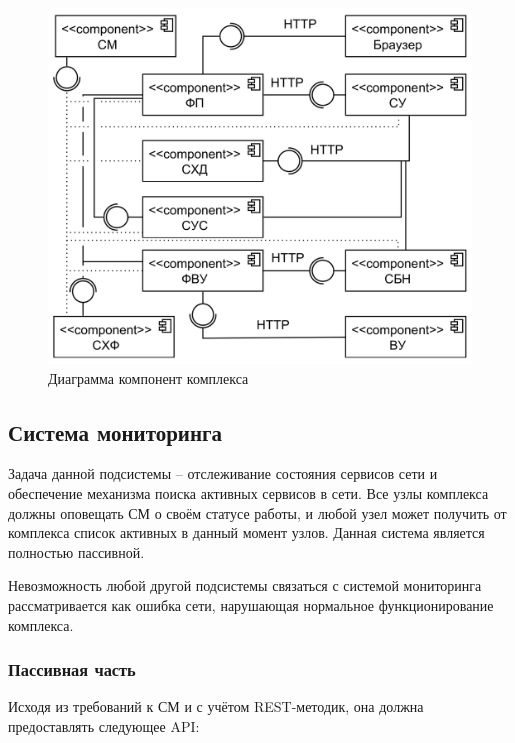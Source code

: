 \documentclass[a4paper,12pt]{report}
\numberwithin{equation}{section}
\begin{document}
  \begin{figure}[b]
    \centering
    \includegraphics[width=.7\linewidth]{diagrams/common/component}
    \caption{Диаграмма компонент комплекса}
    \label{fig:comp-common}
  \end{figure}
  
  \subsection{Система мониторинга}
  Задача данной подсистемы -- отслеживание состояния сервисов сети и обеспечение механизма поиска активных сервисов в сети.
  Все узлы комплекса должны оповещать СМ о своём статусе работы, 
  и любой узел может получить от комплекса список активных в данный момент узлов.
  Данная система является полностью пассивной.
  
  Невозможность любой другой подсистемы связаться с системой мониторинга рассматривается
  как ошибка сети, нарушающая нормальное функционирование комплекса.
  
  \subsubsection{Пассивная часть}
  Исходя из требований к СМ и с учётом REST-методик, она должна предоставлять следующее API:
  
\end{document}
